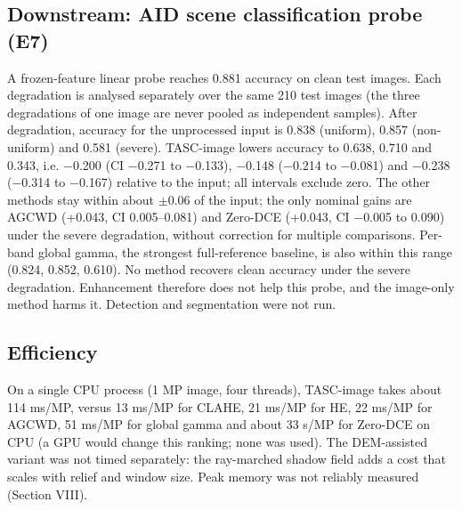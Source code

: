 \documentclass[conference]{IEEEtran}
\begin{document}
\subsection{Downstream: AID scene classification probe (E7)}
A frozen-feature linear probe reaches 0.881 accuracy on clean test images. Each degradation is analysed separately over the same 210 test images (the three degradations of one image are never pooled as independent samples). After degradation, accuracy for the unprocessed input is 0.838 (uniform), 0.857 (non-uniform) and 0.581 (severe). TASC-image lowers accuracy to 0.638, 0.710 and 0.343, i.e. $-$0.200 (CI $-$0.271 to $-$0.133), $-$0.148 ($-$0.214 to $-$0.081) and $-$0.238 ($-$0.314 to $-$0.167) relative to the input; all intervals exclude zero. The other methods stay within about $\pm$0.06 of the input; the only nominal gains are AGCWD (+0.043, CI 0.005--0.081) and Zero-DCE (+0.043, CI $-$0.005 to 0.090) under the severe degradation, without correction for multiple comparisons. Per-band global gamma, the strongest full-reference baseline, is also within this range (0.824, 0.852, 0.610). No method recovers clean accuracy under the severe degradation. Enhancement therefore does not help this probe, and the image-only method harms it. Detection and segmentation were not run.

\begin{table}[t]
\caption{Linear-probe accuracy on 210 AID test images.}
\label{tab:e7}
\centering\scriptsize
\setlength{\tabcolsep}{2.5pt}
\end{table}
\subsection{Efficiency}
On a single CPU process (1 MP image, four threads), TASC-image takes about 114 ms/MP, versus 13 ms/MP for CLAHE, 21 ms/MP for HE, 22 ms/MP for AGCWD, 51 ms/MP for global gamma and about 33 s/MP for Zero-DCE on CPU (a GPU would change this ranking; none was used). The DEM-assisted variant was not timed separately: the ray-marched shadow field adds a cost that scales with relief and window size. Peak memory was not reliably measured (Section VIII).
\end{document}

